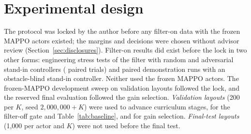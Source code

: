 \documentclass[journal]{IEEEtran}
\begin{document}
\section{Experimental design}\label{sec:design}
The protocol was locked by the author before any filter-on data with the frozen MAPPO actors
existed; the margins and decisions were chosen without advisor review
(Section~\ref{sec:disclosures}). Filter-on results did exist before the lock in two other forms:
engineering stress tests of the filter with random and adversarial stand-in controllers
(\EngStressTrials{} paired trials) and paired demonstration runs with an obstacle-blind stand-in
controller. Neither used the frozen MAPPO actors. The frozen-MAPPO development sweep on validation
layouts followed the lock, and the reserved final evaluation followed the gain selection.
\emph{Validation layouts} (200 per $K$, seed $2{,}000{,}000+K$) were used to advance curriculum stages,
for the filter-off gate and Table~\ref{tab:baseline}, and for gain selection. \emph{Final-test layouts}
(1{,}000 per actor and $K$) were not used before the final test.
\end{document}
